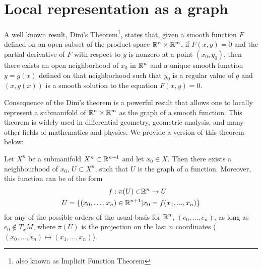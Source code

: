 




\section{Local representation as a graph}

A well known result, Dini's Theorem\footnote{also known as Implicit Function Theorem}, states that, given a smooth function $F$ defined on an open subset of the product space $\mathbb{R}^n \times \mathbb{R}^m$, if $F(x,y) = 0$ and the partial derivative of $F$ with respect to $y$ is nonzero at a point $(x_0, y_0)$, then there exists an open neighborhood of $x_0$ in $\mathbb{R}^n$ and a unique smooth function $y = g(x)$ defined on that neighborhood such that $y_0$ is a regular value of $g$ and $(x, g(x))$ is a smooth solution to the equation $F(x, y) = 0$.

Consequence of the Dini's theorem is a powerful result that allows one to locally represent a submanifold of $\mathbb{R}^n \times \mathbb{R}^m$ as the graph of a smooth function. This theorem is widely used in differential geometry, geometric analysis, and many other fields of mathematics and physics. We provide a version of this theorem below:

\begin{theorem}
	Let $X^n$ be a submanifold $X^n\subset\mathbb{R}^{n+1}$ and let $x_0\in X$. Then there exists a neighbourhood of $x_0$, $U\subset X^n$, such that $U$ is the graph of a function. 
	Moreover, this function can be of the form 
	\begin{align*}
		f:\pi(U)\subset&\mathbb{R}^n\rightarrow U \\
		U=\{(x_0, \dots, x_n)\in \mathbb{R}^{n+1}&|x_0= f(x_1, ..., x_n)\}
	\end{align*}
	for any of the possible orders of the usual basis for $\mathbb{R}^n$, $(e_0, \dots, e_n)$, as long as $e_0\notin T_xM$, where $\pi(U)$ is the projection on the last $n$ coordinates ($(x_0, \dots, x_n) \mapsto (x_1, \dots, x_n)$). \label{localgraphclassic}
\end{theorem}

